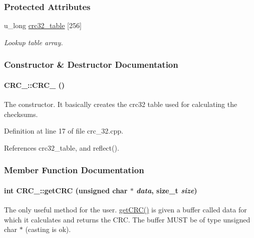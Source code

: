 \subsubsection*{Protected Attributes}
\begin{CompactItemize}
\item 
u\_\-long \hyperlink{classCRC__32_CRC__32n0}{crc32\_\-table} \mbox{[}256\mbox{]}
\begin{CompactList}\small\item\em Lookup table array.\item\end{CompactList}\end{CompactItemize}


\subsubsection{Constructor \& Destructor Documentation}
\hypertarget{classCRC__32_CRC__32a0}{
\paragraph[CRC\_\-32]{\setlength{\rightskip}{0pt plus 5cm}CRC\_::CRC\_ ()}\hfill}
\label{classCRC__32_CRC__32a0}


The constructor. It basically creates the crc32 table used for calculating the checksums. 

Definition at line 17 of file crc\_\-32.cpp.

References crc32\_\-table, and reflect().

\subsubsection{Member Function Documentation}
\hypertarget{classCRC__32_CRC__32a1}{
\paragraph[getCRC]{\setlength{\rightskip}{0pt plus 5cm}int CRC\_::get\-CRC (unsigned char $\ast$ {\em data}, size\_\-t {\em size})}\hfill}
\label{classCRC__32_CRC__32a1}


The only useful method for the user. \hyperlink{classCRC__32_CRC__32a1}{get\-CRC()} is given a buffer called data for which it calculates and returns the CRC. The buffer MUST be of type unsigned char $\ast$ (casting is ok). 

